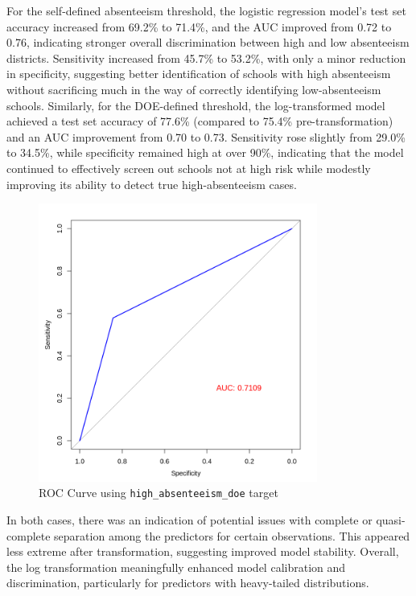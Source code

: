 \documentclass[
  11pt,
]{article}
\begin{document}
For the self-defined absenteeism threshold, the logistic regression
model's test set accuracy increased from 69.2\% to 71.4\%, and the AUC
improved from 0.72 to 0.76, indicating stronger overall discrimination
between high and low absenteeism districts. Sensitivity increased from
45.7\% to 53.2\%, with only a minor reduction in specificity, suggesting
better identification of schools with high absenteeism without
sacrificing much in the way of correctly identifying low-absenteeism
schools. Similarly, for the DOE-defined threshold, the log-transformed
model achieved a test set accuracy of 77.6\% (compared to 75.4\%
pre-transformation) and an AUC improvement from 0.70 to 0.73.
Sensitivity rose slightly from 29.0\% to 34.5\%, while specificity
remained high at over 90\%, indicating that the model continued to
effectively screen out schools not at high risk while modestly improving
its ability to detect true high-absenteeism cases.

\begin{figure}[H]

{\centering \includegraphics[width=3.6in,height=\textheight]{../images/logistic-roc.png}

}

\caption{ROC Curve using \texttt{high\_absenteeism\_doe} target}

\end{figure}%

In both cases, there was an indication of potential issues with complete
or quasi-complete separation among the predictors for certain
observations. This appeared less extreme after transformation,
suggesting improved model stability. Overall, the log transformation
meaningfully enhanced model calibration and discrimination, particularly
for predictors with heavy-tailed distributions.
\end{document}

